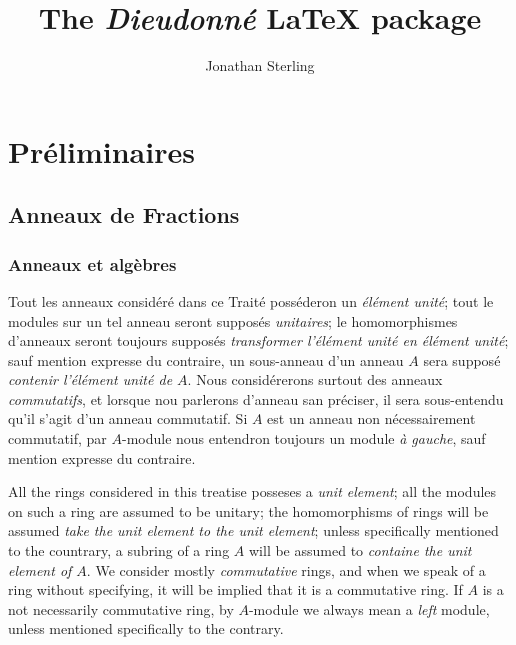 \documentclass[oneside,10pt,french]{memoir}
\title{The \emph{Dieudonn\'e} \LaTeX{} package}
\author{Jonathan Sterling}
\begin{document}
\maketitle

\tableofcontents*

\mainmatter
{}
\chapter{Pr\'eliminaires}

\setcounter{secnumdepth}{30}

\section{Anneaux de Fractions}

\subsection{Anneaux et alg\`ebres}

\begin{minipage}[t]{0.5\textwidth}
  \begin{node}
    Tout les anneaux consid\'er\'e dans ce Trait\'e poss\'ederon un
    \emph{\'el\'ement unit\'e}; tout le modules sur un tel anneau seront
    suppos\'es \emph{unitaires}; le homomorphismes d'anneaux seront toujours
    suppos\'es \emph{transformer l'\'el\'ement unit\'e en \'el\'ement unit\'e};
    sauf mention expresse du contraire, un sous-anneau d'un anneau $A$ sera
    suppos\'e \emph{contenir l'\'el\'ement unit\'e de $A$}. Nous consid\'ererons
    surtout des anneaux \emph{commutatifs}, et lorsque nou parlerons  d'anneau
    san pr\'eciser, il sera sous-entendu qu'il s'agit d'un anneau commutatif. Si
    $A$ est un anneau non n\'ecessairement commutatif, par $A$-module nous
    entendron toujours un module \emph{\`a gauche}, sauf mention expresse du
    contraire.
  \end{node}
\end{minipage}
\quad
\begin{minipage}[t]{0.5\textwidth}
  \addtocounter{node}{-1}
  
  \begin{node}
    All the rings considered in this treatise posseses a \emph{unit element};
    all the modules on such a ring are assumed to be unitary; the homomorphisms
    of rings will be assumed \emph{take the unit element to the unit element};
    unless specifically mentioned to the countrary, a subring of a ring $A$
    will be assumed to \emph{containe the unit element of $A$}. We consider
    mostly \emph{commutative} rings, and when we speak of a ring without
    specifying, it will be implied that  it is a commutative ring. If $A$ is a
    not necessarily commutative ring, by $A$-module we always mean a
    \emph{left} module, unless mentioned specifically to the contrary.
  \end{node}

\end{minipage}
\medskip
\end{document}
